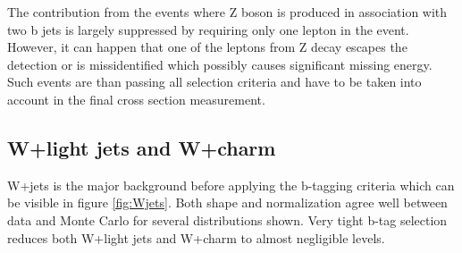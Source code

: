 The contribution from the events where Z boson is produced in association with two b jets is largely suppressed by requiring only one lepton in the event. However, it can happen that one of the leptons from Z decay escapes the detection or is missidentified which possibly causes significant missing energy. Such events are than passing all selection criteria and have to be taken into account in the final cross section measurement. 

\subsection{W+light jets and W+charm}

W+jets is the major background before applying the b-tagging criteria which can be visible in figure \ref{fig:Wjets}. Both shape and normalization agree well between data and Monte Carlo for several distributions shown. Very tight b-tag selection reduces both W+light jets and W+charm to almost negligible levels.  

